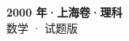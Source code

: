 \documentclass[zihao=-4, a4paper]{ctexart}
\begin{document}
\begin{center}
  {\Large\bfseries 2000 年·上海卷·理科}\\[4pt]
  {\large 数学 · 试题版}
\end{center}
\medskip
{}

\end{document}
